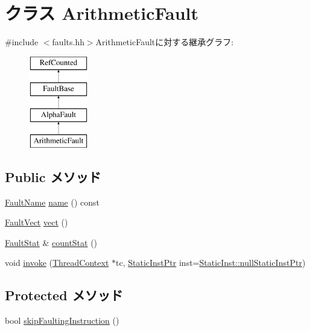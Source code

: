 \hypertarget{classAlphaISA_1_1ArithmeticFault}{
\section{クラス ArithmeticFault}
\label{classAlphaISA_1_1ArithmeticFault}
}


{\ttfamily \#include $<$faults.hh$>$}ArithmeticFaultに対する継承グラフ:\begin{figure}[H]
\begin{center}
\leavevmode
\includegraphics[height=4cm]{classAlphaISA_1_1ArithmeticFault}
\end{center}
\end{figure}
\subsection*{Public メソッド}
\begin{DoxyCompactItemize}
\item 
\hyperlink{sim_2faults_8hh_abb196df64725e5c2568c900cf130d8d7}{FaultName} \hyperlink{classAlphaISA_1_1ArithmeticFault_a73adb23259baf912a81683a9790a303f}{name} () const 
\item 
\hyperlink{classm5_1_1params_1_1Addr}{FaultVect} \hyperlink{classAlphaISA_1_1ArithmeticFault_ae15c5d7ab0162821b93d668d0b225198}{vect} ()
\item 
\hyperlink{classStats_1_1Scalar}{FaultStat} \& \hyperlink{classAlphaISA_1_1ArithmeticFault_a6c79663c761ff57265459f7e3aefaf4c}{countStat} ()
\item 
void \hyperlink{classAlphaISA_1_1ArithmeticFault_a2bd783b42262278d41157d428e1f8d6f}{invoke} (\hyperlink{classThreadContext}{ThreadContext} $\ast$tc, \hyperlink{classRefCountingPtr}{StaticInstPtr} inst=\hyperlink{classStaticInst_aa793d9793af735f09096369fb17567b6}{StaticInst::nullStaticInstPtr})
\end{DoxyCompactItemize}
\subsection*{Protected メソッド}
\begin{DoxyCompactItemize}
\item 
bool \hyperlink{classAlphaISA_1_1ArithmeticFault_a4dca22d2e3f19609672fe85bb5e28b56}{skipFaultingInstruction} ()
\end{DoxyCompactItemize}
